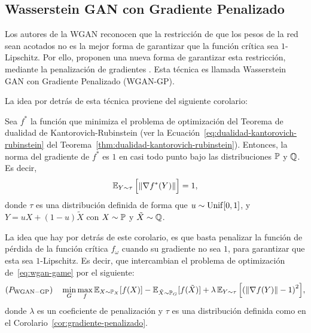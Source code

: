 \subsection{Wasserstein GAN con Gradiente Penalizado}\label{ssec:}  %
Los autores de la WGAN reconocen que la restricción de que los pesos de la red sean acotados no es la mejor forma de garantizar que la función crítica sea $1$-Lipschitz. Por ello, proponen una nueva forma de garantizar esta restricción, mediante la penalización de gradientes \cite{gulrajani2017improved}. Esta técnica es llamada Wasserstein GAN con Gradiente Penalizado (WGAN-GP).

La idea por detrás de esta técnica proviene del siguiente corolario:

\begin{corollary}\label{cor:gradiente-penalizado}
	Sea $f^\ast$ la función que minimiza el problema de optimización del Teorema de dualidad de Kantorovich-Rubinstein (ver la Ecuación~\eqref{eq:dualidad-kantorovich-rubinstein} del Teorema~\ref{thm:dualidad-kantorovich-rubinstein}). Entonces, la norma del gradiente de $f^\ast$ es $1$ en casi todo punto bajo las distribuciones $\Prob$ y $\ProbQ$. Es decir,
	\begin{equation}
		\Exp_{Y\sim\tau} \qty\Big[ \norm{\nabla f^\ast(Y)} ] = 1,
	\end{equation}
	donde $\tau$ es una distribución definida de forma que $u\sim\mathrm{Unif}[0, 1]$, y $Y = uX + (1-u)\tilde X$ con $X\sim\Prob$ y $\tilde X\sim\ProbQ$.
\end{corollary}

La idea que hay por detrás de este corolario, es que basta penalizar la función de pérdida de la función crítica $f_\omega$ cuando su gradiente no sea $1$, para garantizar que esta sea $1$-Lipschitz. Es decir, que intercambian el problema de optimización de~\eqref{eq:wgan-game} por el siguiente:
\begin{equation}
	(P_{\mathrm{WGAN-GP}}) \quad \min_{G} \max_{f} \Exp_{X\sim \Prob_X} [f(X)] - \Exp_{\tilde X \sim \Prob_G} [f(\tilde X)] + \lambda \Exp_{Y\sim\tau} \qty\Big[ \qty(\norm{\nabla f(Y)} - 1)^2 ],
\end{equation}
donde $\lambda$ es un coeficiente de penalización y $\tau$ es una distribución definida como en el Corolario~\ref{cor:gradiente-penalizado}.

